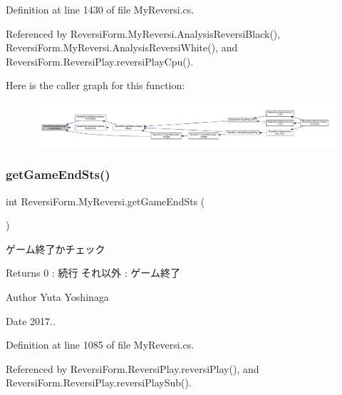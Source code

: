 Definition at line 1430 of file My\+Reversi.\+cs.



Referenced by Reversi\+Form.\+My\+Reversi.\+Analysis\+Reversi\+Black(), Reversi\+Form.\+My\+Reversi.\+Analysis\+Reversi\+White(), and Reversi\+Form.\+Reversi\+Play.\+reversi\+Play\+Cpu().

Here is the caller graph for this function\+:
\nopagebreak
\begin{figure}[H]
\begin{center}
\leavevmode
\includegraphics[width=350pt]{class_reversi_form_1_1_my_reversi_a64216270f06c7c309d39bfcb681dd1b3_icgraph}
\end{center}
\end{figure}
\mbox{\label{class_reversi_form_1_1_my_reversi_aa39c8c111afeb4ea3bf2befbd9f1434b}} 
\subsubsection{\texorpdfstring{get\+Game\+End\+Sts()}{getGameEndSts()}}
{\footnotesize\ttfamily int Reversi\+Form.\+My\+Reversi.\+get\+Game\+End\+Sts (\begin{DoxyParamCaption}{ }\end{DoxyParamCaption})}



ゲーム終了かチェック 

\begin{DoxyReturn}{Returns}
0 \+: 続行 それ以外 \+: ゲーム終了 
\end{DoxyReturn}
\begin{DoxyAuthor}{Author}
Yuta Yoshinaga 
\end{DoxyAuthor}
\begin{DoxyDate}{Date}
2017.. 
\end{DoxyDate}


Definition at line 1085 of file My\+Reversi.\+cs.



Referenced by Reversi\+Form.\+Reversi\+Play.\+reversi\+Play(), and Reversi\+Form.\+Reversi\+Play.\+reversi\+Play\+Sub().

